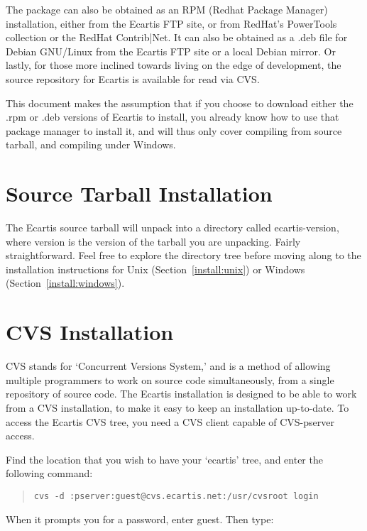 \documentclass{book}
\begin{document}
The package can also be obtained as an RPM (Redhat Package Manager)
installation, either from the Ecartis FTP site, or from RedHat's PowerTools
collection or the RedHat Contrib|Net.  It can also be obtained as a .deb file
for Debian GNU/Linux from the Ecartis FTP site or a local Debian mirror.  Or
lastly, for those more inclined towards living on the edge of development, the
source repository for Ecartis is available for read via CVS.
   
This document makes the assumption that if you choose to download either the
.rpm or .deb versions of Ecartis to install, you already know how to use that
package manager to install it, and will thus only cover compiling from source
tarball, and compiling under Windows.

\section{Source Tarball Installation}
\label{install:tarball}

The Ecartis source tarball will unpack into a directory called ecartis-version,
where version is the version of the tarball you are unpacking.  Fairly
straightforward.  Feel free to explore the directory tree before moving along
to the installation instructions for Unix (Section~\ref{install:unix}) or
Windows (Section~\ref{install:windows}).

\section{CVS Installation}
\label{install:CVS}

CVS stands for `Concurrent Versions System,' and is a method of allowing
multiple programmers to work on source code simultaneously, from a single
repository of source code. The Ecartis installation is designed to be able to
work from a CVS installation, to make it easy to keep an installation
up-to-date.  To access the Ecartis CVS tree, you need a CVS client capable of
CVS-pserver access.
   
Find the location that you wish to have your `ecartis' tree, and enter the
following command:

\begin{quote}
\footnotesize
\begin{verbatim}
cvs -d :pserver:guest@cvs.ecartis.net:/usr/cvsroot login
\end{verbatim}
\end{quote}

When it prompts you for a password, enter guest.  Then type:
   
\end{document}

